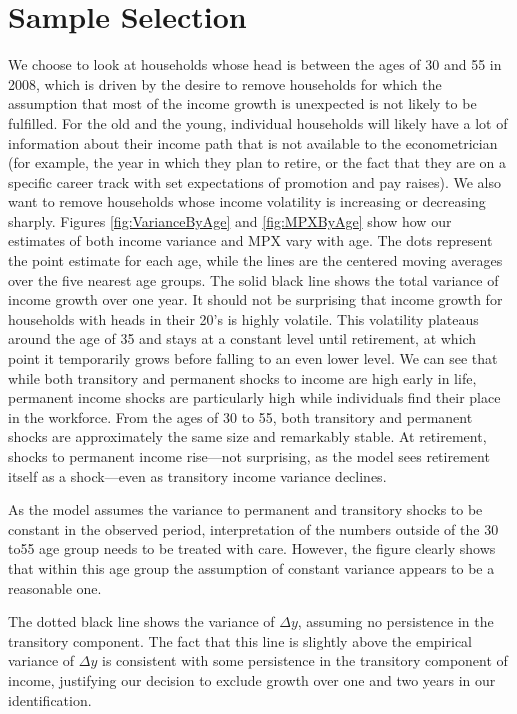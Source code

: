 \documentclass[titlepage]{\econtex}\newcommand{\texname}{ConsumptionHeterogeneity}
\begin{document}
	\section{Sample Selection} \label{sample_selection}
	\setcounter{figure}{0}   
	\setcounter{table}{0} 
	We choose to look at households whose head is between the ages of 30 and 55 in 2008, which is driven by the desire to remove households for which the assumption that most of the income growth is unexpected is not likely to be fulfilled. For the old and the young, individual households will likely have a lot of information about their income path that is not available to the econometrician (for example, the year in which they plan to retire, or the fact that they are on a specific career track with set expectations of promotion and pay raises). We also want to remove households whose income volatility is increasing or decreasing sharply. Figures \ref{fig:VarianceByAge} and \ref{fig:MPXByAge} show how our estimates of both income variance and MPX vary with age. The dots represent the point estimate for each age, while the lines are the centered moving averages over the five nearest age groups. The solid black line shows the total variance of income growth over one year. It should not be surprising that income growth for households with heads in their 20's is highly volatile. This volatility plateaus around the age of 35 and stays at a constant level until retirement, at which point it temporarily grows before falling to an even lower level. We can see that while both transitory and permanent shocks to income are high early in life, permanent income shocks are particularly high while individuals find their place in the workforce. From the ages of 30 to 55, both transitory and permanent shocks are approximately the same size and remarkably stable. At retirement, shocks to permanent income rise---not surprising, as the model sees retirement itself as a shock---even as transitory income variance declines.
	
	As the model assumes the variance to permanent and transitory shocks to be constant in the observed period, interpretation of the numbers outside of the 30 to55 age group needs to be treated with care. However, the figure clearly shows that within this age group the assumption of constant variance appears to be a reasonable one.
	
	The dotted black line shows the variance of $\Delta y$, assuming no persistence in the transitory component. The fact that this line is slightly above the empirical variance of $\Delta y$ is consistent with some persistence in the transitory component of income, justifying our decision to exclude growth over one and two years in our identification.
	
\end{document}
